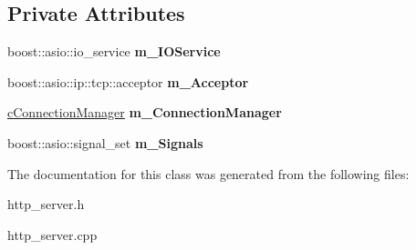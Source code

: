 \subsection*{\-Private \-Attributes}
\begin{DoxyCompactItemize}
\item 
\hypertarget{classhttp__server_1_1cHttpServer_ae02a73720c1b0fa45b787ef0cecacb6c}{
boost\-::asio\-::io\-\_\-service {\bfseries m\-\_\-\-I\-O\-Service}}
\label{classhttp__server_1_1cHttpServer_ae02a73720c1b0fa45b787ef0cecacb6c}

\item 
\hypertarget{classhttp__server_1_1cHttpServer_a2d4db5bec75f0594e81403e8659ec2a0}{
boost\-::asio\-::ip\-::tcp\-::acceptor {\bfseries m\-\_\-\-Acceptor}}
\label{classhttp__server_1_1cHttpServer_a2d4db5bec75f0594e81403e8659ec2a0}

\item 
\hypertarget{classhttp__server_1_1cHttpServer_a87a2959bcad40f733bb9bd79f03bc017}{
\hyperlink{classhttp__server_1_1cConnectionManager}{c\-Connection\-Manager} {\bfseries m\-\_\-\-Connection\-Manager}}
\label{classhttp__server_1_1cHttpServer_a87a2959bcad40f733bb9bd79f03bc017}

\item 
\hypertarget{classhttp__server_1_1cHttpServer_a6332aa8cd965ba14ee125d90e309c483}{
boost\-::asio\-::signal\-\_\-set {\bfseries m\-\_\-\-Signals}}
\label{classhttp__server_1_1cHttpServer_a6332aa8cd965ba14ee125d90e309c483}

\end{DoxyCompactItemize}


\-The documentation for this class was generated from the following files\-:\begin{DoxyCompactItemize}
\item 
http\-\_\-server.\-h\item 
http\-\_\-server.\-cpp\end{DoxyCompactItemize}
